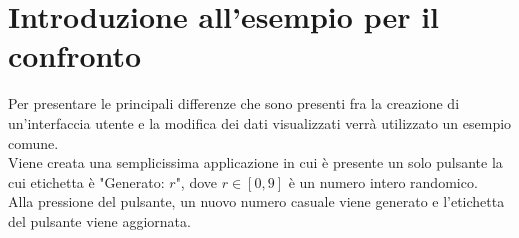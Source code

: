 \section{Introduzione all'esempio per il confronto}
\label{sec:introduzione-esempio-confronto-paradigmi}

Per presentare le principali differenze che sono presenti fra la creazione di un'interfaccia utente e la modifica dei dati visualizzati verrà utilizzato un esempio comune.\\
Viene creata una semplicissima applicazione in cui è presente un solo pulsante la cui etichetta è "Generato: $r$", dove $r \in [0, 9]$ è un numero intero randomico.\\
Alla pressione del pulsante, un nuovo numero casuale viene generato e l'etichetta del pulsante viene aggiornata.